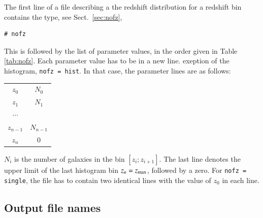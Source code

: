 \documentclass[11pt, chapterprefix, headsepline]{scrartcl}
\begin{document}
\begin{appendix}
The first line of a file describing a the redshift distribution for a
redshift bin contains the type, see Sect.~\ref{sec:nofz},
\begin{verbatim}
# nofz
\end{verbatim}
This is followed by the list of parameter values, in the order given in Table
\ref{tab:nofz}. Each parameter value has to be in a new line.
exeption of the histogram, \texttt{nofz = hist}. In that case, the
parameter lines are as follows:

\medskip

\begin{tabular}{cc}
  $z_0$ \quad & $N_0$ \\
  $z_1$ & $N_1$ \\
  $\cdots$ \\
  $z_{n-1}$ & $N_{n-1}$ \\
  $z_n$ & $0$ \\
\end{tabular}

$N_i$ is the number of galaxies in the bin $[z_i; z_{i+1}]$.  The last
line denotes the upper limit of the last histogram bin $z_n = z_{\rm
  max}$, followed by a zero.
For \texttt{nofz = single}, the file has
to contain two identical lines with the value of $z_0$ in each line.




\subsection{Output file names}


\end{appendix}
\end{document}
